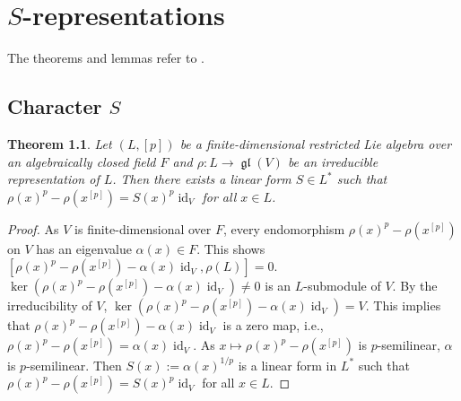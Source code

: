 \documentclass[12pt,MSc]{muthesis_2023}
\theoremstyle{plain}%
\newtheorem{Theorem}[FactCounter]{Theorem} %
\theoremstyle{definition}
\theoremstyle{remark}
\DeclareMathOperator{\gl}{\mathfrak{gl}}
\DeclareMathOperator{\id}{id}
\begin{document}
\chapter{$S$-representations}
The theorems and lemmas refer to \cite[Section 3, Section 7, Chapter 5]{SF}.

\section{Character $S$}
\begin{Theorem}\label{Spxpx[p]=S}
Let $(L, [p])$ be a finite-dimensional restricted Lie algebra over an algebraically closed field $F$ and $\rho:L \rightarrow \gl(V)$ be an irreducible representation of $L$. Then there exists a linear form $S\in L^*$ such that $\rho(x)^p-\rho(x^{[p]})={S(x)}^p\id_V$ for all $x\in L$.
\end{Theorem}

\begin{proof}
As $V$ is finite-dimensional over $F$, every endomorphism ${\rho(x)}^p-\rho(x^{[p]})$ on $V$ has an eigenvalue $\alpha(x)\in F$. This shows $\left[{\rho(x)}^p-\rho(x^{[p]})-\alpha(x)\id_V, \rho(L)\right]=0$. $\ker({\rho(x)}^p-\rho(x^{[p]})-\alpha(x)\id_V)\neq 0$ is an $L$-submodule of $V$. By the irreducibility of $V$, $\ker({\rho(x)}^p-\rho(x^{[p]})-\alpha(x)\id_V)=V$. This implies that ${\rho(x)}^p-\rho(x^{[p]})-\alpha(x)\id_V$ is a zero map, i.e., ${\rho(x)}^p-\rho(x^{[p]})=\alpha(x)\id_V$. As $x \mapsto{\rho(x)}^p-\rho(x^{[p]})$ is $p$-semilinear, $\alpha$ is $p$-semilinear. Then $S(x) := \alpha(x)^{1/p}$ is a linear form in $L^*$ such that ${\rho(x)}^p-\rho(x^{[p]})={S(x)}^p\id_V$ for all $x\in L$.
\end{proof}
\end{document}
